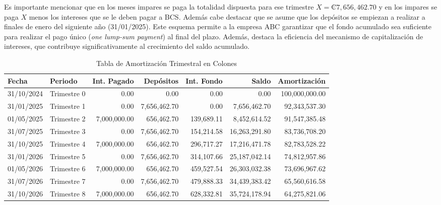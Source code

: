 \documentclass[12pt]{article}
\begin{document}
Es importante mencionar que en los meses impares se paga la totalidad dispuesta para ese trimestre $X=₡7,656,462.70$ y en los impares se paga $X$ menos los intereses que se le deben pagar a BCS. Además cabe destacar que se asume que los depósitos se empiezan a realizar a finales de enero del siguiente año (31/01/2025). Este esquema permite a la empresa ABC garantizar que el fondo acumulado sea suficiente para realizar el pago único (\textit{one lump-sum payment}) al final del plazo. Además, destaca la eficiencia del mecanismo de capitalización de intereses, que contribuye significativamente al crecimiento del saldo acumulado.

\setlength{\abovecaptionskip}{10pt} %
\begin{table}[H]
\centering
\caption{Tabla de Amortización Trimestral en Colones}
\begin{adjustbox}{max width=\textwidth}
\begin{threeparttable}
\vspace{0.1cm}
\begin{tabular}{llrrrrr}
\hline\hline
        \textbf{Fecha} & \textbf{Periodo} & \textbf{Int. Pagado} & \textbf{Depósitos} & \textbf{Int. Fondo} & \textbf{Saldo} & \textbf{Amortización} \\ \hline
              31/10/2024 & Trimestre 0 & 0.00 & 0.00 & 0.00 & 0.00 & 100,000,000.00 \\ 
              31/01/2025 & Trimestre 1 & 0.00 & 7,656,462.70 & 0.00 & 7,656,462.70 & 92,343,537.30 \\ 
              01/05/2025 & Trimestre 2 & 7,000,000.00 & 656,462.70 & 139,689.11 & 8,452,614.52 & 91,547,385.48 \\ 
              31/07/2025 & Trimestre 3 & 0.00 & 7,656,462.70 & 154,214.58 & 16,263,291.80 & 83,736,708.20 \\ 
              31/10/2025 & Trimestre 4 & 7,000,000.00 & 656,462.70 & 296,717.27 & 17,216,471.78 & 82,783,528.22 \\ 
              31/01/2026 & Trimestre 5 & 0.00 & 7,656,462.70 & 314,107.66 & 25,187,042.14 & 74,812,957.86 \\ 
              01/05/2026 & Trimestre 6 & 7,000,000.00 & 656,462.70 & 459,527.54 & 26,303,032.38 & 73,696,967.62 \\ 
              31/07/2026 & Trimestre 7 & 0.00 & 7,656,462.70 & 479,888.33 & 34,439,383.42 & 65,560,616.58 \\ 
              31/10/2026 & Trimestre 8 & 7,000,000.00 & 656,462.70 & 628,332.81 & 35,724,178.94 & 64,275,821.06 \\ 

\end{tabular}
\end{threeparttable}
\end{adjustbox}
\end{table}
\end{document}
